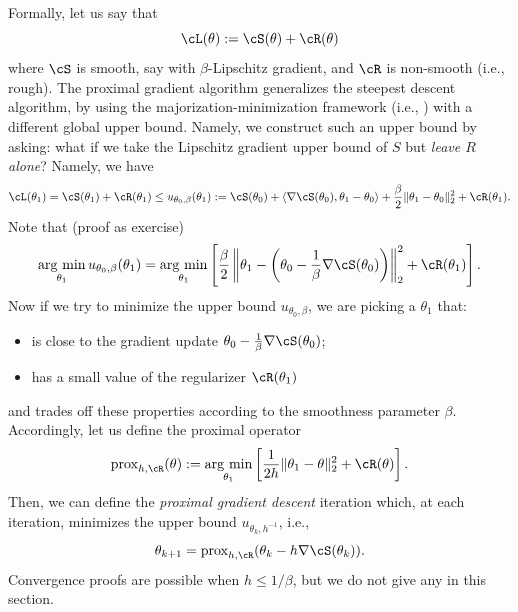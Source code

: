\documentclass[../../book-main.tex]{subfiles}
\begin{document}
Formally, let us say that 
\begin{equation}
    \cL(\theta) := \cS(\theta) + \cR(\theta)
\end{equation}
where \(\cS\) is smooth, say with \(\beta\)-Lipschitz gradient, and \(\cR\) is non-smooth (i.e., rough). The proximal gradient algorithm generalizes the steepest descent algorithm, by using the majorization-minimization framework (i.e., ) with a different global upper bound. Namely, we construct such an upper bound by asking: what if we take the Lipschitz gradient upper bound of \(S\) but \textit{leave \(R\) alone}?  Namely, we have 
\begin{equation}
    \cL(\theta_{1}) = \cS(\theta_{1}) + \cR(\theta_{1}) \leq u_{\theta_{0}, \beta}(\theta_{1}) := \cS(\theta_{0}) + \ip{\nabla \cS(\theta_{0})}{\theta_{1} - \theta_{0}} + \frac{\beta}{2}\norm{\theta_{1} - \theta_{0}}_{2}^{2} + \cR(\theta_{1}).
\end{equation}
Note that (proof as exercise)
\begin{equation}
    \argmin_{\theta_{1}}u_{\theta_{0}, \beta}(\theta_{1}) = \argmin_{\theta_{1}}\bs{\frac{\beta}{2}\norm*{\theta_{1} - \bp{\theta_{0} - \frac{1}{\beta}\nabla \cS(\theta_{0})}}_{2}^{2} + \cR(\theta_{1})}.
\end{equation}
Now if we try to minimize the upper bound \(u_{\theta_{0}, \beta}\), we are picking a \(\theta_{1}\) that:
\begin{itemize}
    \item is close to the gradient update \(\theta_{0} - \frac{1}{\beta}\nabla \cS(\theta_{0})\);
    \item has a small value of the regularizer \(\cR(\theta_{1})\)
\end{itemize}
and trades off these properties according to the smoothness parameter \(\beta\). Accordingly, let us define the proximal operator
\begin{equation}
    \prox_{h, \cR}(\theta) := \argmin_{\theta_{1}}\bs{\frac{1}{2h}\norm{\theta_{1} - \theta}_{2}^{2} + \cR(\theta)}.
\end{equation}
Then, we can define the \textit{proximal gradient descent} iteration which, at each iteration, minimizes the upper bound \(u_{\theta_{k}, h^{-1}}\), i.e.,
\begin{equation}
    \theta_{k + 1} = \prox_{h, \cR}(\theta_{k} - h\nabla \cS(\theta_{k})).
\end{equation}
Convergence proofs are possible when \(h \leq 1/\beta\), but we do not give any in this section.
\end{document}
